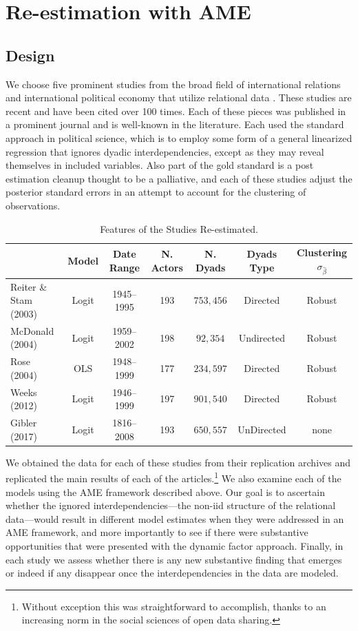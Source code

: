 \section{Re-estimation with AME}
 
\subsection{Design}

We choose five prominent studies from the broad field of international relations and international political economy that utilize relational data \citep{reiter:stam:2003, mcdonald:2004,  rose:2004, weeks:2012, gibler:2017}. These studies are recent and have been cited over 100 times. Each of these pieces was published in a prominent journal and is well-known in the literature. Each used the standard approach in political science, which is to employ some form of a general linearized regression that ignores dyadic interdependencies, except as they may reveal themselves in included variables. Also part of the gold standard is a post estimation cleanup thought to be a palliative, and each of these studies adjust the posterior standard errors in an attempt to account for the clustering of observations.

\begin{table}
\caption{Features of the Studies Re-estimated. }
	\begin{tabular}{lcccccc}
& Model &  Date Range & N. Actors  & N. Dyads & Dyads Type & Clustering $\sigma_{\hat{\beta}}$ \\ \toprule
Reiter \& Stam (2003) &Logit &1945--1995 &  193 & $753,456$ & Directed & Robust \\	
McDonald (2004) & Logit &1959--2002 & 198 & $92,354$ & Undirected & Robust\\
Rose (2004) & OLS & 1948--1999 & 177 & $234,597$ & Directed & Robust \\	 
Weeks (2012) & Logit & 1946--1999 &197 &  $901,540$ & Directed & Robust \\
Gibler (2017) & Logit & 1816--2008 &193 &   $650,557$ & UnDirected & none \\ \bottomrule
	\end{tabular}
\end{table}

We obtained the data for each of these studies from their replication archives and replicated the main results of each of the articles.\footnote{Without exception this was straightforward to accomplish, thanks to an increasing norm in the social sciences of open data sharing.} We also examine each of the models using the AME framework described above.  Our goal is to ascertain whether the ignored interdependencies---the non-iid structure of the relational data---would result in different model estimates when they were addressed in an AME framework, and more importantly to see if there were substantive opportunities that were presented with the dynamic factor approach.  
Finally, in each study we assess whether there is any new substantive finding that emerges or indeed if any disappear once the interdependencies in the data are modeled.

